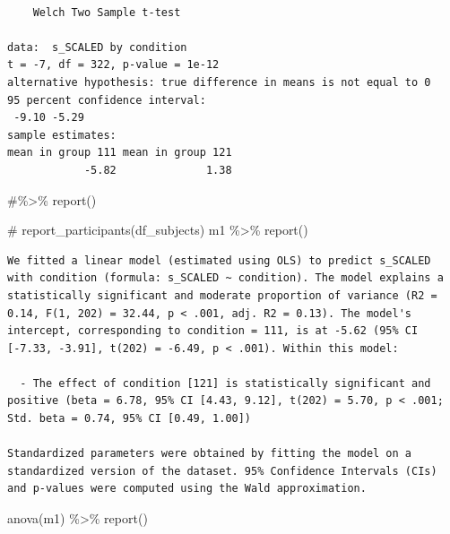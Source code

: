 \documentclass[
  letterpaper,
  DIV=11,
  numbers=noendperiod]{scrreprt}
\newenvironment{Shaded}{\begin{snugshade}}{\end{snugshade}}
\newcommand{\CommentTok}[1]{\textcolor[rgb]{0.37,0.37,0.37}{#1}}
\newcommand{\FunctionTok}[1]{\textcolor[rgb]{0.28,0.35,0.67}{#1}}
\newcommand{\NormalTok}[1]{\textcolor[rgb]{0.00,0.23,0.31}{#1}}
\newcommand{\SpecialCharTok}[1]{\textcolor[rgb]{0.37,0.37,0.37}{#1}}
\begin{document}
\begin{verbatim}

    Welch Two Sample t-test

data:  s_SCALED by condition
t = -7, df = 322, p-value = 1e-12
alternative hypothesis: true difference in means is not equal to 0
95 percent confidence interval:
 -9.10 -5.29
sample estimates:
mean in group 111 mean in group 121 
            -5.82              1.38 
\end{verbatim}

\begin{Shaded}
\begin{Highlighting}[]
\CommentTok{\#\%\textgreater{}\% report()}
\end{Highlighting}
\end{Shaded}

\begin{Shaded}
\begin{Highlighting}[]
\CommentTok{\# report\_participants(df\_subjects)}
\NormalTok{m1 }\SpecialCharTok{\%\textgreater{}\%} \FunctionTok{report}\NormalTok{()}
\end{Highlighting}
\end{Shaded}

\begin{verbatim}
We fitted a linear model (estimated using OLS) to predict s_SCALED with condition (formula: s_SCALED ~ condition). The model explains a statistically significant and moderate proportion of variance (R2 = 0.14, F(1, 202) = 32.44, p < .001, adj. R2 = 0.13). The model's intercept, corresponding to condition = 111, is at -5.62 (95% CI [-7.33, -3.91], t(202) = -6.49, p < .001). Within this model:

  - The effect of condition [121] is statistically significant and positive (beta = 6.78, 95% CI [4.43, 9.12], t(202) = 5.70, p < .001; Std. beta = 0.74, 95% CI [0.49, 1.00])

Standardized parameters were obtained by fitting the model on a standardized version of the dataset. 95% Confidence Intervals (CIs) and p-values were computed using the Wald approximation.
\end{verbatim}

\begin{Shaded}
\begin{Highlighting}[]
\FunctionTok{anova}\NormalTok{(m1) }\SpecialCharTok{\%\textgreater{}\%} \FunctionTok{report}\NormalTok{()}
\end{Highlighting}
\end{Shaded}
\end{document}
